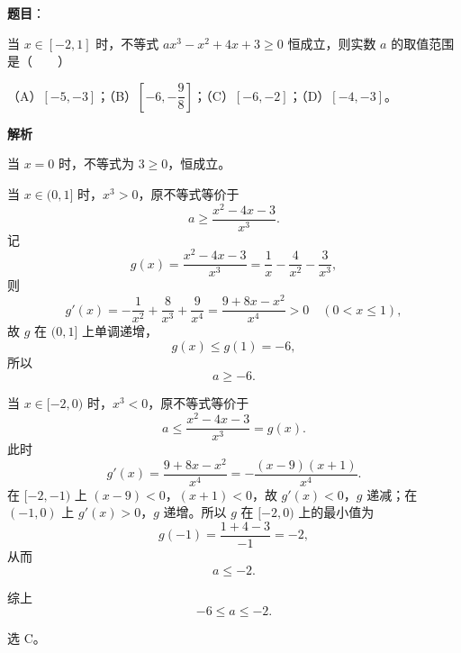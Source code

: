 \begin{answer}

\textbf{题目}：

当 $x\in[-2,1]$ 时，不等式 $ax^3-x^2+4x+3\geqslant 0$ 恒成立，则实数 $a$ 的取值范围是\mbox{（　　）}

（A）$[-5,-3]$；（B）$\left[-6,-\dfrac98\right]$；（C）$[-6,-2]$；（D）$[-4,-3]$。

\textbf{解析}

当 $x=0$ 时，不等式为 $3\geqslant0$，恒成立。

当 $x\in(0,1]$ 时，$x^3>0$，原不等式等价于
\nopagebreak[4]
\[a\geqslant\frac{x^2-4x-3}{x^3}.\]
记
\nopagebreak[4]
\[g(x)=\frac{x^2-4x-3}{x^3}=\frac1x-\frac4{x^2}-\frac3{x^3},\]
则
\nopagebreak[4]
\[g'(x)=-\frac1{x^2}+\frac8{x^3}+\frac9{x^4}=\frac{9+8x-x^2}{x^4}>0\quad(0<x\leqslant1),\]
故 $g$ 在 $(0,1]$ 上单调递增，
\nopagebreak[4]
\[g(x)\leqslant g(1)=-6,\]
所以
\nopagebreak[4]
\[a\geqslant-6.\]

当 $x\in[-2,0)$ 时，$x^3<0$，原不等式等价于
\nopagebreak[4]
\[a\leqslant\frac{x^2-4x-3}{x^3}=g(x).\]
此时
\nopagebreak[4]
\[g'(x)=\frac{9+8x-x^2}{x^4}=-\frac{(x-9)(x+1)}{x^4}.\]
在 $[-2,-1)$ 上 $(x-9)<0$，$(x+1)<0$，故 $g'(x)<0$，$g$ 递减；在 $(-1,0)$ 上 $g'(x)>0$，$g$ 递增。所以 $g$ 在 $[-2,0)$ 上的最小值为
\nopagebreak[4]
\[g(-1)=\frac{1+4-3}{-1}=-2,\]
从而
\nopagebreak[4]
\[a\leqslant-2.\]

综上
\nopagebreak[4]
\[-6\leqslant a\leqslant-2.\]

选 C。


\end{answer}
